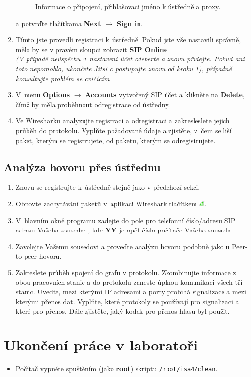 \begin{enumerate}
\begin{figure}[h!]
  \caption{Informace o připojení, přihlašovací jméno k ústředně a proxy.}
  \label{fig:sip_connection}
\end{figure}
    a potvrďte tlačítkama {\bf Next $\rightarrow$ Sign in}.
    \item Tímto jste provedli registraci k ústředně. Pokud jste vše nastavili správně, mělo by se v pravém sloupci zobrazit {\bf SIP Online} \\
    {\it (V případě neúspěchu v nastavení účet odeberte a znovu přidejte. Pokud ani toto nepomohlo, ukončete Jitsi a postupujte znovu od kroku 1), případně konzultujte problém se cvičícím}
    \item V menu {\bf Options} $\rightarrow$ {\bf Accounts} vytvořený SIP účet a klikněte na {\bf Delete}, čímž by měla proběhnout odregistrace od ústředny.
    \item Ve Wiresharku analyzujte registraci a odregistraci a zakresleslete jejich průběh do protokolu. Vyplňte požadované údaje a zjistěte, v čem se liší paket, kterým se registrujete, od paketu, kterým se odregistrujete.
\end{enumerate}


\subsection{Analýza hovoru přes ústřednu}
\begin{enumerate}
    \item Znovu se registrujte k ústředně stejně jako v předchozí sekci.
    \item Obnovte zachytávání paketů v aplikaci Wireshark tlačítkem \includegraphics[width=3mm]{img/ws_start.png}.
    \item V hlavním okně programu zadejte do pole pro telefonní číslo/adresu SIP adresu Vašeho souseda: , kde {\bf YY} je opět číslo počítače Vašeho souseda.
    \item Zavolejte Vašemu sousedovi a proveďte analýzu hovoru podobně jako u Peer-to-peer hovoru.
    \item Zakreslete průběh spojení do grafu v protokolu. Zkombinujte informace
      z obou pracovních stanic a do protokolu zaneste úplnou komunikaci všech
      tří stanic. Uveďte, mezi kterými IP adresami a porty probíhá signalizace a mezi kterými přenos dat. Vyplňte, které protokoly se používají pro signalizaci a které pro přenos. Dále zjistěte, jaký kodek pro přenos hlasu byl použit.
\end{enumerate}

\section{Ukončení práce v laboratoři}
\begin{itemize}
  \item Počítač vypněte spuštěním (jako {\bf root}) skriptu {\tt /root/isa4/clean}.
\end{itemize}
